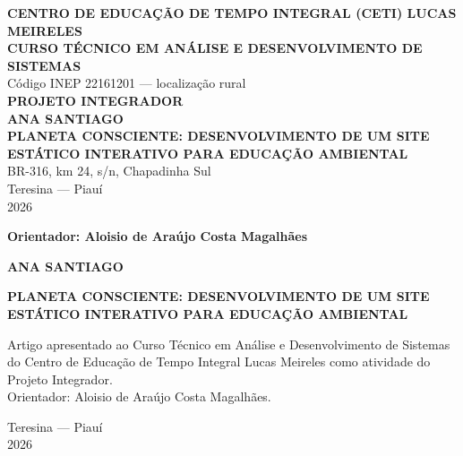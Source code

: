 \documentclass[12pt,oneside,a4paper,brazil]{abntex2}
\newcommand{\tituloartigo}{Planeta Consciente: desenvolvimento de um site estático interativo para educação ambiental}
\begin{document}
\begin{capa}
\begin{center}
\textbf{CENTRO DE EDUCAÇÃO DE TEMPO INTEGRAL (CETI) LUCAS MEIRELES}\\
\textbf{CURSO TÉCNICO EM ANÁLISE E DESENVOLVIMENTO DE SISTEMAS}\\[0.4cm]
Código INEP 22161201 — localização rural\\[1.8cm]
\textbf{PROJETO INTEGRADOR}\\[2.4cm]
\textbf{ANA SANTIAGO}\\[2.4cm]
\textbf{\MakeUppercase{\tituloartigo}}\\[2.4cm]
BR-316, km 24, s/n, Chapadinha Sul\\
Teresina — Piauí\\2026
\end{center}
\vfill
\begin{center}\textbf{Orientador: Aloisio de Araújo Costa Magalhães}\end{center}
\end{capa}

\begin{folhaderosto}
\begin{center}\textbf{ANA SANTIAGO}\end{center}
\vspace{2.5cm}
\begin{center}\textbf{\MakeUppercase{\tituloartigo}}\end{center}
\vspace{1.5cm}
\hfill\begin{minipage}{0.52\textwidth}
Artigo apresentado ao Curso Técnico em Análise e Desenvolvimento de Sistemas do Centro de Educação de Tempo Integral Lucas Meireles como atividade do Projeto Integrador.\\[0.5cm]
Orientador: Aloisio de Araújo Costa Magalhães.
\end{minipage}
\vfill
\begin{center}Teresina — Piauí\\2026\end{center}
\end{folhaderosto}
\end{document}
